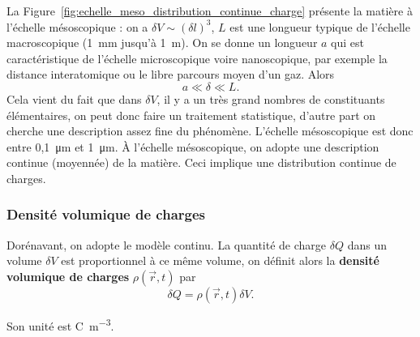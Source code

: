             La Figure~\ref{fig:echelle_meso_distribution_continue_charge} présente la matière à l'échelle mésoscopique : on a $\delta V\sim(\delta l)^{3}$, $L$ est une longueur typique de l'échelle macroscopique (1~\si{\milli\metre} jusqu'à 1~\si{\metre}). On se donne un longueur $a$ qui est caractéristique de l'échelle microscopique voire nanoscopique, par exemple la distance interatomique ou le libre parcours moyen d'un gaz. Alors
            \begin{equation*}
                \boxed{
                    a\ll \delta \ll L.
                }
            \end{equation*}
            Cela vient du fait que dans $\delta V$, il y a un très grand nombres de constituants élémentaires, on peut donc faire un traitement statistique, d'autre part on cherche une description assez fine du phénomène. L'échelle mésoscopique est donc entre 0,1~\si{\micro\metre} et 1~\si{\micro\metre}. 
            À l'échelle mésoscopique, on adopte une description continue (moyennée) de la matière. Ceci implique une distribution continue de charges.

        \subsubsection{Densité volumique de charges}

            Dorénavant, on adopte le modèle continu. La quantité de charge $\delta Q$ dans un volume $\delta V$ est proportionnel à ce même volume, on définit alors la \textbf{densité volumique de charges} $\rho(\vec{r},t)$ par 
            \begin{equation*}
                \boxed{
                    \delta Q=\rho(\vec{r},t)\delta V.
                }
            \end{equation*}

            Son unité est \si{\coulomb\per\metre\cubed}.

